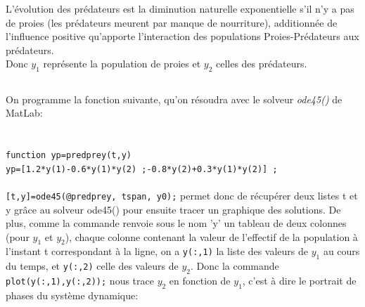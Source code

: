 \documentclass[a4paper,12pt,landscape]{article}
\begin{document}
L'évolution des prédateurs est la diminution naturelle exponentielle s'il n'y a pas de proies (les prédateurs meurent par manque de nourriture), additionnée de l'influence positive qu'apporte l'interaction des populations Proies-Prédateurs aux prédateurs.\\

Donc $y_1$ représente la population de proies et $y_2$ celles des prédateurs.

\subsection{}

On programme la fonction suivante, qu'on résoudra avec le solveur \textit{ode45()} de MatLab:\\
 \\
 \\ 
\texttt{function yp=predprey(t,y)\\
yp=[1.2*y(1)-0.6*y(1)*y(2) ;-0.8*y(2)+0.3*y(1)*y(2)] ;}\\
 \\
\texttt{[t,y]=ode45(@predprey, tspan, y0);} permet donc de récupérer deux listes t et y grâce au solveur ode45() pour ensuite tracer un graphique des solutions.
De plus, comme la commande renvoie sous le nom 'y' un tableau de deux colonnes (pour $y_1$ et $y_2$), chaque colonne contenant la valeur de l'effectif de la population à l'instant t correspondant à la ligne, on a \texttt{y(:,1)} la liste des valeurs de $y_1$ au cours du temps, et \texttt{y(:,2)} celle des valeurs de $y_2$. Donc la commande \texttt{plot(y(:,1),y(:,2));} nous trace $y_2$ en fonction de $y_1$, c'est à dire le portrait de phases du système dynamique:
\end{document}
